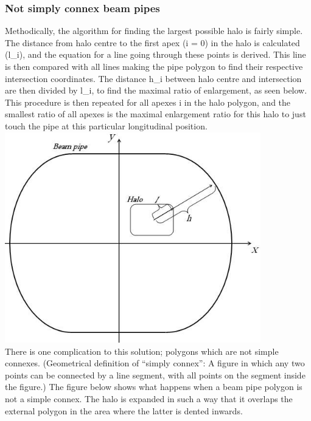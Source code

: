 \begin{itemize}
\subsubsection{Not simply connex beam pipes} Methodically, the algorithm for finding the largest possible halo is fairly simple. The distance from halo centre to the first apex (i = 0) in the halo is calculated (l\_i), and the equation for a line going through these points is derived. This line is then compared with all lines making the pipe polygon to find their respective intersection coordinates. The distance h\_i between halo centre and intersection are then divided by l\_i, to find the maximal ratio of enlargement, as seen below. This procedure is then repeated for all apexes i in the halo polygon, and the smallest ratio  of all apexes is the maximal enlargement ratio for this halo to just touch the pipe at this particular longitudinal position.
\\
\includegraphics[width=420px]{Introduction/notsimple0.jpg}%
\\  There is one complication to this solution; polygons which are not simple connexes. (Geometrical definition of ``simply connex'': A figure in which any two points can be connected by a line segment, with all points on the segment inside the figure.) The figure below shows what happens when a beam pipe polygon is not a simple connex. The halo is expanded in such a way that it overlaps the external polygon in the area where the latter is dented inwards.
\\

\end{itemize}
